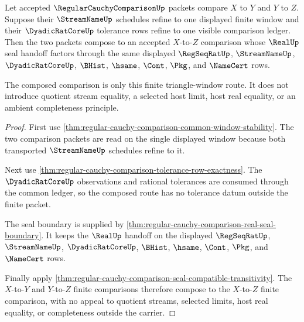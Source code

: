 \begin{theorem}
\label{thm:regular-cauchy-comparison-triangle-window-composition}
Let accepted $\RegularCauchyComparisonUp$ packets compare $X$ to $Y$ and
$Y$ to $Z$. Suppose their $\StreamNameUp$ schedules refine to one displayed
finite window and their $\DyadicRatCoreUp$ tolerance rows refine to one
visible comparison ledger. Then the two packets compose to an accepted
$X$-to-$Z$ comparison whose $\RealUp$ seal handoff factors through the same
displayed $\RegSeqRatUp$, $\StreamNameUp$, $\DyadicRatCoreUp$, $\BHist$,
$\hsame$, $\Cont$, $\Pkg$, and $\NameCert$ rows.

The composed comparison is only this finite triangle-window route. It does
not introduce quotient stream equality, a selected host limit, host real
equality, or an ambient completeness principle.
\end{theorem}
\begin{proof}
First use
\autoref{thm:regular-cauchy-comparison-common-window-stability}. The two
comparison packets are read on the single displayed window because both
transported $\StreamNameUp$ schedules refine to it.

Next use
\autoref{thm:regular-cauchy-comparison-tolerance-row-exactness}. The
$\DyadicRatCoreUp$ observations and rational tolerances are consumed through
the common ledger, so the composed route has no tolerance datum outside the
finite packet.

The seal boundary is supplied by
\autoref{thm:regular-cauchy-comparison-real-seal-boundary}. It keeps the
$\RealUp$ handoff on the displayed $\RegSeqRatUp$, $\StreamNameUp$,
$\DyadicRatCoreUp$, $\BHist$, $\hsame$, $\Cont$, $\Pkg$, and $\NameCert$ rows.

Finally apply
\autoref{thm:regular-cauchy-comparison-seal-compatible-transitivity}. The
$X$-to-$Y$ and $Y$-to-$Z$ finite comparisons therefore compose to the
$X$-to-$Z$ finite comparison, with no appeal to quotient streams, selected
limits, host real equality, or completeness outside the carrier.
\end{proof}

